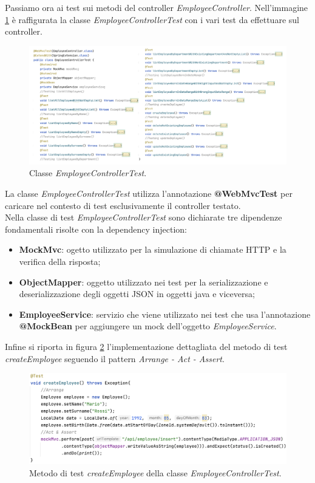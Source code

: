 \FloatBarrier
Passiamo ora ai test sui metodi del controller \textit{EmployeeController}. Nell'immagine \ref{employee-controller-test} è raffigurata la classe \textit{EmployeeControllerTest} con i vari test da effettuare sul controller.
\FloatBarrier
\begin{figure}[!ht]
\begin{mdframed}
\centering
\includegraphics[width=1\linewidth]{immagini/EmployeeControllerTest.pdf}
\end{mdframed}
\caption{Classe \textit{EmployeeControllerTest}.}
\label{employee-controller-test}
\end{figure}
\FloatBarrier
La classe \textit{EmployeeControllerTest} utilizza l'annotazione \textbf{@WebMvcTest} per caricare nel contesto di test esclusivamente il controller testato.\\
Nella classe di test \textit{EmployeeControllerTest} sono dichiarate tre dipendenze fondamentali risolte con la dependency injection:
\begin{itemize}
  \item \textbf{MockMvc}: ogetto utilizzato per la simulazione di chiamate HTTP e la verifica della risposta;
  \item \textbf{ObjectMapper}: oggetto utilizzato nei test per la serializzazione e deserializzazione degli oggetti JSON in oggetti java e viceversa;
  \item \textbf{EmployeeService}: servizio che viene utilizzato nei test che usa l'annotazione \textbf{@MockBean} per aggiungere un mock dell'oggetto \textit{EmployeeService}.
\end{itemize}
Infine si riporta in figura \ref{create-employee} l'implementazione dettagliata del metodo di test \textit{createEmployee} seguendo il pattern \textit{Arrange - Act - Assert}.
\FloatBarrier
\begin{figure}[!ht]
\begin{mdframed}
\centering
\includegraphics[width=1\linewidth]{immagini/createEmployee.png}
\end{mdframed}
\caption{Metodo di test \textit{createEmployee} della classe \textit{EmployeeControllerTest}.}
\label{create-employee}
\end{figure}
